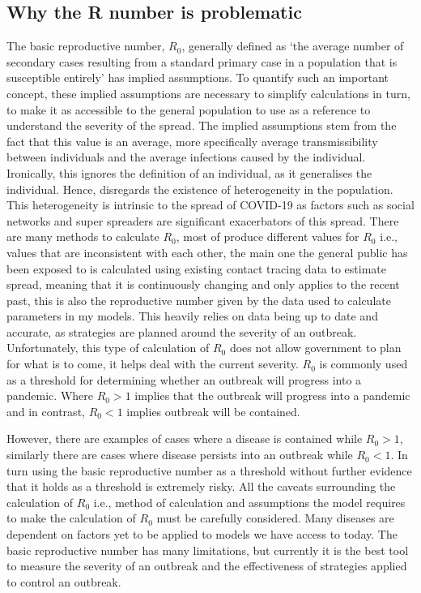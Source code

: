\documentclass[11pt]{article}
\begin{document}
\subsection{Why the R number is problematic}
The basic reproductive number, $R_0$, generally defined as ‘the average number of secondary cases resulting from a standard primary case in a population that is susceptible entirely’ has implied assumptions. To quantify such an important concept, these implied assumptions are necessary to simplify calculations in turn, to make it as accessible to the general population to use as a reference to understand the severity of the spread. The implied assumptions stem from the fact that this value is an average, more specifically average transmissibility between individuals and the average infections caused by the individual. Ironically, this ignores the definition of an individual, as it generalises the individual. Hence, disregards the existence of heterogeneity in the population. This heterogeneity is intrinsic to the spread of COVID-19 as factors such as social networks and super spreaders\citep{ Reich2020.04.30.20081828} are significant exacerbators of this spread.
There are many methods to calculate $R_0$, most of produce different values for $R_0$ i.e., values that are inconsistent with each other\citep{breban2007theory}, the main one the general public has been exposed to is calculated using existing contact tracing data to estimate spread\citep{R0calculationBBC}, meaning that it is continuously changing and only applies to the recent past, this is also the reproductive number given by the data used to calculate parameters in my models. This heavily relies on data being up to date and accurate, as strategies are planned around the severity of an outbreak. Unfortunately, this type of calculation of $R_0$ does not allow government to plan for what is to come, it helps deal with the current severity.
$R_0$ is commonly used as a threshold for determining whether an outbreak will progress into a pandemic. Where $R_0>1$ implies that the outbreak will progress into a pandemic and in contrast, $R_0<1$ implies outbreak will be contained. \par
However, there are examples of cases where a disease is contained while $R_0>1$, similarly there are cases where disease persists into an outbreak while $R_0<1$\citep{li2011failure}. In turn using the basic reproductive number as a threshold without further evidence that it holds as a threshold is extremely risky. All the caveats surrounding the calculation of $R_0$ i.e., method of calculation and assumptions the model requires to make the calculation of $R_0$ must be carefully considered\citep{li2011failure}. Many diseases are dependent on factors yet to be applied to models we have access to today. The basic reproductive number has many limitations, but currently it is the best tool to measure the severity of an outbreak and the effectiveness of strategies applied to control an outbreak.
\end{document}
